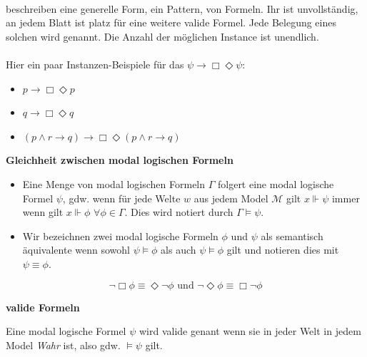 %
%
\paragraph{\formelSchemata} %
\label{par:formel_schemata}
\formelSchemata beschreiben eine generelle Form, ein Pattern, von Formeln.
Ihr \parseTree ist unvollständig, an jedem Blatt ist platz für eine weitere valide \ML Formel.
Jede Belegung eines solchen \formelSchema wird  genannt.
Die Anzahl der möglichen Instance ist unendlich.\\
\\
Hier ein paar Instanzen-Beispiele für das \formelSchema $\psi \rightarrow \Box \Diamond \psi$:\\
\begin{itemize}
	\item $p \rightarrow \Box \Diamond p$
	\item $q \rightarrow \Box \Diamond q$
	\item $(p \wedge r \rightarrow q) \rightarrow \Box \Diamond (p \wedge r \rightarrow q)$
\end{itemize}


\textbf{Gleichheit zwischen modal logischen Formeln}
\begin{definition}
	\label{def:model_folgert}
	\begin{itemize}
		\item Eine Menge von modal logischen Formeln $\Gamma$ folgert eine modal logische Formel $\psi$, gdw. wenn für jede Welte $w$ aus jedem Model $\mathcal{M}$ gilt $x \Vdash \psi$ immer wenn gilt $x \Vdash \phi$ $\forall \phi \in \Gamma$. 
		Dies wird notiert durch $\Gamma \vDash \psi$.
		\item Wir bezeichnen zwei modal logische Formeln $\phi$ und $\psi$ als semantisch äquivalente wenn sowohl $\psi \vDash \phi$ als auch $\psi \vDash \phi$ gilt und notieren dies mit $\psi \equiv \phi$.
	\end{itemize}	
\end{definition}
\cite[S.313]{huth2004logic}


\begin{equation}
	\neg \Box \phi \equiv \Diamond \neg \phi \text{ und } \neg \Diamond \phi \equiv \Box \neg \phi
\end{equation}


\textbf{valide Formeln}
\begin{definition}
	\label{def:valide}
	Eine modal logische Formel $\psi$ wird valide genant wenn sie in jeder Welt in jedem Model \emph{Wahr} ist, also gdw. $\vDash \psi$ gilt.
\end{definition}
\cite[S.314]{huth2004logic}

